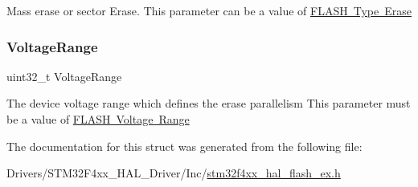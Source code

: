 Mass erase or sector Erase. This parameter can be a value of \mbox{\hyperlink{group___f_l_a_s_h_ex___type___erase}{F\+L\+A\+SH Type Erase}} \mbox{\label{struct_f_l_a_s_h___erase_init_type_def_a85dd2161de6dd6ee5b24e87dcc674024}} 
\subsubsection{\texorpdfstring{Voltage\+Range}{VoltageRange}}
{\footnotesize\ttfamily uint32\+\_\+t Voltage\+Range}

The device voltage range which defines the erase parallelism This parameter must be a value of \mbox{\hyperlink{group___f_l_a_s_h_ex___voltage___range}{F\+L\+A\+SH Voltage Range}} 

The documentation for this struct was generated from the following file\+:\begin{DoxyCompactItemize}
\item 
Drivers/\+S\+T\+M32\+F4xx\+\_\+\+H\+A\+L\+\_\+\+Driver/\+Inc/\mbox{\hyperlink{stm32f4xx__hal__flash__ex_8h}{stm32f4xx\+\_\+hal\+\_\+flash\+\_\+ex.\+h}}\end{DoxyCompactItemize}
